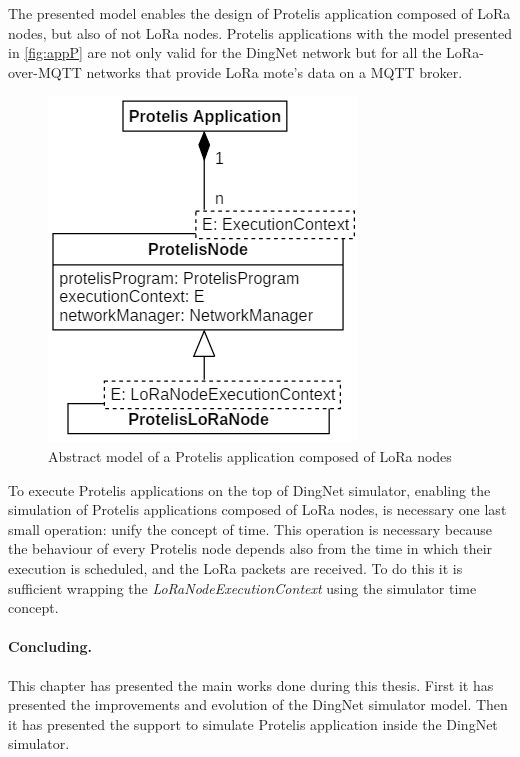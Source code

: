 % 
The presented model enables the design of Protelis application composed of LoRa nodes, but also of not LoRa nodes.
Protelis applications with the model presented in \autoref{fig:appP} are not only valid for the DingNet network but for all the LoRa-over-MQTT networks that provide LoRa mote's data on a MQTT broker.
% 
\begin{figure}[H]
    \centering
    \includegraphics{figures/app.png}
    \caption{Abstract model of a Protelis application composed of LoRa nodes}
    \label{fig:appP}
\end{figure}
% 
\noindent To execute Protelis applications on the top of DingNet simulator, enabling the simulation of Protelis applications composed of LoRa nodes, is necessary one last small operation: unify the concept of time. 
This operation is necessary because the behaviour of every Protelis node depends also from the time in which their execution is scheduled, and the LoRa packets are received.
To do this it is sufficient wrapping the \mbox{\textit{LoRaNodeExecutionContext}} using the simulator time concept.

\paragraph{Concluding.} This chapter has presented the main works done during this thesis. First it has presented the improvements and evolution of the DingNet simulator model. Then it has presented the support to simulate Protelis application inside the DingNet simulator. 